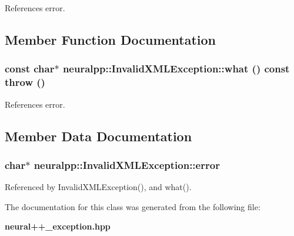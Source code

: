 References error.

\subsection{Member Function Documentation}
\subsubsection[what]{\setlength{\rightskip}{0pt plus 5cm}const char$\ast$ neuralpp::InvalidXMLException::what () const  throw ()\hspace{0.3cm}{\tt  [inline]}}\label{classneuralpp_1_1InvalidXMLException_4a8b81678ed0c319e1715ab5ef9112da}




References error.

\subsection{Member Data Documentation}
\subsubsection[error]{\setlength{\rightskip}{0pt plus 5cm}char$\ast$ {\bf neuralpp::InvalidXMLException::error}\hspace{0.3cm}{\tt  [private]}}\label{classneuralpp_1_1InvalidXMLException_e0c63b17f7b5b0df20d8361bc9ee92b4}




Referenced by InvalidXMLException(), and what().

The documentation for this class was generated from the following file:\begin{CompactItemize}
\item 
{\bf neural++\_\-exception.hpp}\end{CompactItemize}
